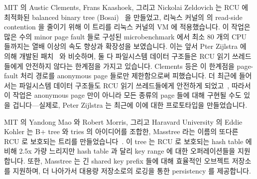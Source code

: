 MIT 의 Austic Clements, Frans Kaashoek, 그리고 Nickolai Zeldovich 는 RCU 에
최적화된 balanced binary tree (Bosai)~\cite{AustinClements2012RCULinux:mmapsem}
을 만들었고, 리눅스 커널의  의 read-side contention 을 줄이기 위해
이 트리를 리눅스 커널의 VM 에 적용했습니다.
이 작업은 많은 수의 minor page fault 들로 구성된 microbenchmark 에서 최소 80
개의 CPU 들까지는 열배 이상의 속도 향상과 확장성을 보였습니다.
이는 앞서 Pter Zijlstra 에 의해 개발된
패치~\cite{PeterZijlstra2014SpeculativePageFault} 와 비슷하며, 둘 다 파일시스템
데이터 구조들은 RCU 읽기 쓰레드들에게 안전하지 않다는 한계점을 가지고 있습니다.
Clements 등은 이 한계점을 page-fault 처리 경로를 anonymous page 들로만
제한함으로써 피했습니다.
더 최근에 들어서는 파일시스템 데이터 구조들도 RCU 읽기 쓰레드들에게 안전하게
되었고~\cite{JonathanCorbet2010dcacheRCU,JonathanCorbet2011dcacheRCUbug},
따라서 이 작업은 anonymous page 만이 아니라 모든 종류의 page 들에 대해 구현될
수도 있을 겁니다---실제로, Peter Zijlstra 는 최근에 이에 대한 프로토타입을
만들었습니다.
\iffalse

Austin Clements, Frans Kaashoek, and Nickolai Zeldovich
of MIT created an RCU-optimized balanced binary tree
(Bonsai)~\cite{AustinClements2012RCULinux:mmapsem}, and applied this
tree to the Linux kernel's VM subsystem in order to reduce read-side
contention on the Linux kernel's \co{mmap_sem}.
This work resulted in order-of-magnitude speedups and scalability up to
at least 80 CPUs for a microbenchmark featuring large numbers of minor
page faults.
This is similar to a patch developed earlier by
Peter Zijlstra~\cite{PeterZijlstra2014SpeculativePageFault}, and both
were limited by the fact that, at the time, filesystem data structures
were not safe for RCU readers.
Clements et al. avoided this limitation by optimizing the page-fault
path for anonymous pages only.
More recently, filesystem data structures have been made safe for RCU
readers~\cite{JonathanCorbet2010dcacheRCU,JonathanCorbet2011dcacheRCUbug},
so perhaps this work can be implemented for all page types, not just
anonymous pages---Peter Zijlstra has, in fact, recently prototyped
exactly this.
\fi

MIT 의 Yandong Mao 와 Robert Morris, 그리고 Haravard University 의 Eddie Kohler
는 B+ tree 와 tries 의 아이디어를 조합한, Masstree 라는 이름의 또다른 RCU 로
보호되는 트리를 만들었습니다~\cite{Mao:2012:CCF:2168836.2168855}.
이 tree 는 RCU 로 보호되는 hash table 에 비해 2.5x 가량 느리지만 hash table 과
달리 key range 에 대한 오퍼레이션들을 지원합니다.
또한, Masstree 는 긴 shared key prefix 들에 대해 효율적인 오브젝트 저장소를
지원하며, 더 나아가서 대용량 저장소로의 로깅을 통한 persistency 를 제공합니다.

